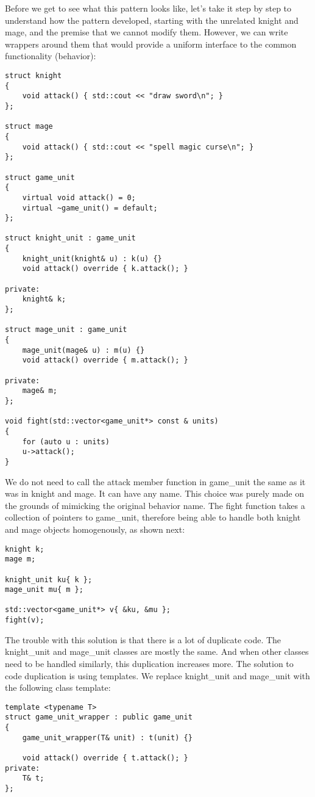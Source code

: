 Before we get to see what this pattern looks like, let’s take it step by step to understand how the pattern developed, starting with the unrelated knight and mage, and the premise that we cannot modify them. However, we can write wrappers around them that would provide a uniform interface to the common functionality (behavior):

\begin{lstlisting}[style=styleCXX]
struct knight
{
	void attack() { std::cout << "draw sword\n"; }
};

struct mage
{
	void attack() { std::cout << "spell magic curse\n"; }
};

struct game_unit
{
	virtual void attack() = 0;
	virtual ~game_unit() = default;
};

struct knight_unit : game_unit
{
	knight_unit(knight& u) : k(u) {}
	void attack() override { k.attack(); }
	
private:
	knight& k;
};

struct mage_unit : game_unit
{
	mage_unit(mage& u) : m(u) {}
	void attack() override { m.attack(); }
	
private:
	mage& m;
};

void fight(std::vector<game_unit*> const & units)
{
	for (auto u : units)
	u->attack();
}
\end{lstlisting}

We do not need to call the attack member function in game\_unit the same as it was in knight and mage. It can have any name. This choice was purely made on the grounds of mimicking the original behavior name. The fight function takes a collection of pointers to game\_unit, therefore being able to handle both knight and mage objects homogenously, as shown next:

\begin{lstlisting}[style=styleCXX]
knight k;
mage m;

knight_unit ku{ k };
mage_unit mu{ m };

std::vector<game_unit*> v{ &ku, &mu };
fight(v);
\end{lstlisting}

The trouble with this solution is that there is a lot of duplicate code. The knight\_unit and mage\_unit classes are mostly the same. And when other classes need to be handled similarly, this duplication increases more. The solution to code duplication is using templates. We replace knight\_unit and mage\_unit with the following class template:

\begin{lstlisting}[style=styleCXX]
template <typename T>
struct game_unit_wrapper : public game_unit
{
	game_unit_wrapper(T& unit) : t(unit) {}
	
	void attack() override { t.attack(); }
private:
	T& t;
};
\end{lstlisting}

